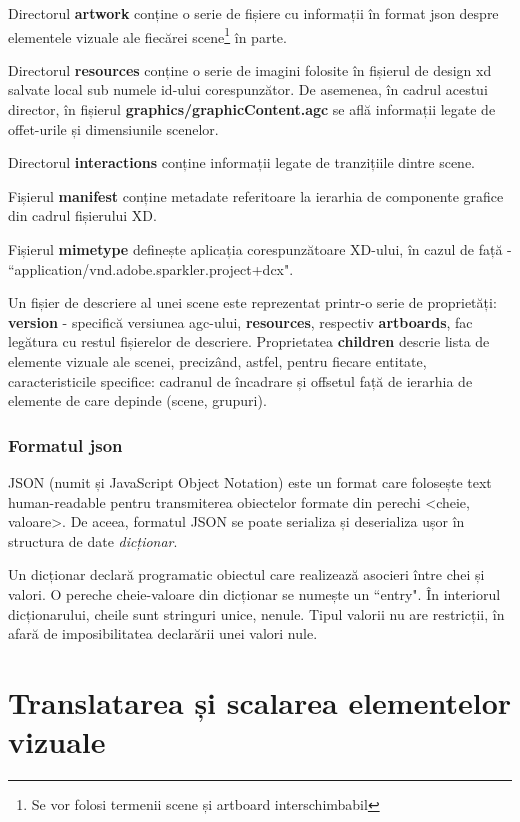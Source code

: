 Directorul \textbf{artwork} conține o serie de fișiere cu informații în format json despre elementele vizuale ale fiecărei scene\footnote{Se vor folosi termenii scene și artboard interschimbabil} în parte. 

Directorul \textbf{resources} conține o serie de imagini folosite în fișierul de design xd salvate local sub numele id-ului corespunzător. De asemenea, în cadrul acestui director, în fișierul \textbf{graphics/graphicContent.agc} se află informații legate de offet-urile și dimensiunile scenelor.

Directorul \textbf{interactions} conține informații legate de tranzițiile dintre scene.

Fișierul \textbf{manifest} conține metadate referitoare la ierarhia de componente grafice din cadrul fișierului XD. 

Fișierul \textbf{mimetype} definește aplicația corespunzătoare XD-ului, în cazul de față - ``application/vnd.adobe.sparkler.project+dcx".

Un fișier de descriere al unei scene este reprezentat printr-o serie de proprietăți:  \textbf{version} - specifică versiunea agc-ului, \textbf{resources}, respectiv \textbf{artboards}, fac legătura cu restul fișierelor de descriere. Proprietatea  \textbf{children} descrie lista de elemente vizuale ale scenei, precizând, astfel, pentru fiecare entitate, caracteristicile specifice: cadranul de încadrare și offsetul față de ierarhia de elemente de care depinde (scene, grupuri).

\subsubsection{Formatul json}

JSON (numit și JavaScript Object Notation) este un format care folosește text human-readable pentru transmiterea obiectelor formate din perechi <cheie, valoare>. De aceea, formatul JSON se poate serializa și deserializa ușor în structura de date \textit{dicționar}.

Un dicționar declară programatic obiectul care realizează asocieri între chei și valori. O pereche cheie-valoare din dicționar se numește un ``entry". În interiorul dicționarului, cheile sunt stringuri unice, nenule. Tipul valorii nu are restricții, în afară de imposibilitatea declarării unei valori nule.

\section{Translatarea și scalarea elementelor vizuale}\label{transScal}


